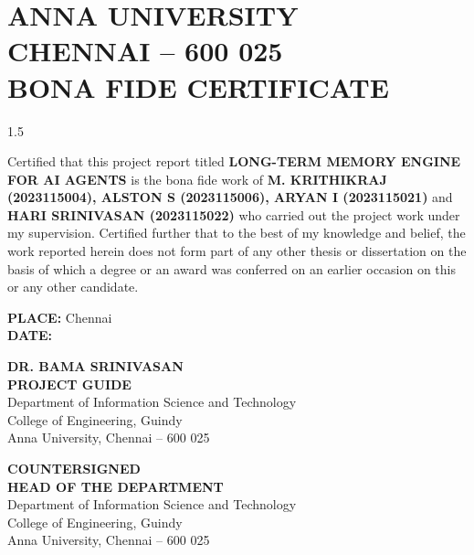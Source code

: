 \documentclass[13 pt,a4paper]{aureportm}
\begin{document}
\chapter*{ANNA UNIVERSITY\\
CHENNAI -- 600 025\\
BONA FIDE CERTIFICATE}
\newlength{\datewidth}
\settowidth{\datewidth}{Chennai 600 025}

\begin{spacing}{1.5}
  \begin{sloppypar}
  \fontsize{13}{14.5}\selectfont Certified that this project report titled
  \textbf{LONG-TERM MEMORY ENGINE FOR AI AGENTS} is the bona fide work of
  \textbf{M. KRITHIKRAJ (2023115004), ALSTON S (2023115006), ARYAN I (2023115021)}
  and \textbf{HARI SRINIVASAN (2023115022)} who carried out the project work under
  my supervision. Certified further that to the best of my knowledge and belief, the
  work reported herein does not form part of any other thesis or dissertation on the
  basis of which a degree or an award was conferred on an earlier occasion on this or
  any other candidate.
  \end{sloppypar}
\end{spacing}
\vspace{-0.3 cm}
\begin{flushleft}
 \parbox[t]{\datewidth}{\small{\textbf{PLACE: }}Chennai\\[1cm]
 \small{\textbf{DATE: }}}
 \hfill
 \parbox[t]{7 cm}{\small{\textbf{DR. BAMA SRINIVASAN}} \\
 \small{\textbf{PROJECT GUIDE}}\\
 \small{Department of Information Science and Technology}\\
 \small{College of Engineering, Guindy}\\
 \small{Anna University, Chennai -- 600 025}
 }
\end{flushleft}
\begin{center}
 \small{\textbf{COUNTERSIGNED}}\\
  \vspace{1.5 cm}
 \small{\textbf{HEAD OF THE DEPARTMENT}}\\
 \small{Department of Information Science and Technology}\\
 \small{College of Engineering, Guindy}\\
 \small{Anna University, Chennai -- 600 025}
\end{center}
\end{document}
